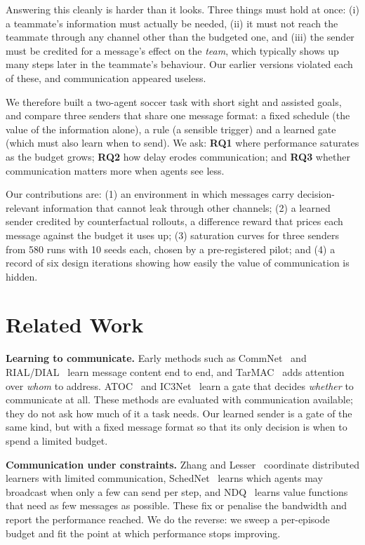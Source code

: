 \documentclass[twocolumn]{article}
\begin{document}
Answering this cleanly is harder than it looks. Three things must hold at once: (i) a teammate's
information must actually be needed, (ii) it must not reach the teammate through any channel other
than the budgeted one, and (iii) the sender must be credited for a message's effect on the
\emph{team}, which typically shows up many steps later in the teammate's behaviour. Our earlier
versions violated each of these, and communication appeared useless.

We therefore built a two-agent soccer task with short sight and assisted goals, and compare three
senders that share one message format: a fixed schedule (the value of the information alone), a rule
(a sensible trigger) and a learned gate (which must also learn when to send). We ask:
\textbf{RQ1} where performance saturates as the budget grows; \textbf{RQ2} how delay erodes
communication; and \textbf{RQ3} whether communication matters more when agents see less.

Our contributions are: (1) an environment in which messages carry decision-relevant information that
cannot leak through other channels; (2) a learned sender credited by counterfactual rollouts, a
difference reward that prices each message against the budget it uses up; (3) saturation curves for
three senders from 580 runs with 10 seeds each, chosen by a pre-registered pilot; and (4) a record of
six design iterations showing how easily the value of communication is hidden.

\clearpage
\section{Related Work}

\textbf{Learning to communicate.} Early methods such as CommNet~\citep{sukhbaatar2016} and
RIAL/DIAL~\citep{foerster2016} learn message content end to end, and TarMAC~\citep{das2019} adds attention over \emph{whom} to address.
ATOC~\citep{jiang2018} and IC3Net~\citep{singh2019} learn a gate that decides \emph{whether} to
communicate at all. These methods are evaluated with communication available; they do not ask how much
of it a task needs. Our learned sender is a gate of the same kind, but with a fixed message format so
that its only decision is when to spend a limited budget.

\textbf{Communication under constraints.} Zhang and Lesser~\citep{zhang2013} coordinate distributed
learners with limited communication, SchedNet~\citep{kim2019} learns which agents may broadcast when
only a few can send per step, and NDQ~\citep{wang2020} learns value functions that need as few messages
as possible. These fix or penalise the bandwidth and report the performance reached. We do the
reverse: we sweep a per-episode budget and fit the point at which performance stops improving.
\end{document}
